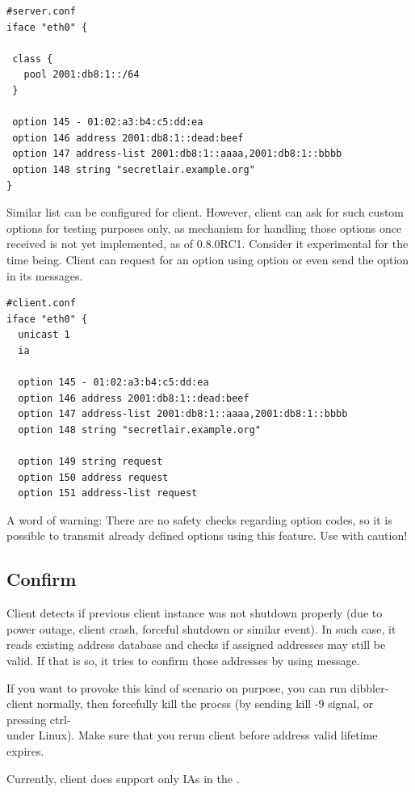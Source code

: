 \begin{lstlisting}
#server.conf
iface "eth0" {

 class {
   pool 2001:db8:1::/64
 }

 option 145 - 01:02:a3:b4:c5:dd:ea
 option 146 address 2001:db8:1::dead:beef
 option 147 address-list 2001:db8:1::aaaa,2001:db8:1::bbbb
 option 148 string "secretlair.example.org"
}
\end{lstlisting}

Similar list can be configured for client. However, client can ask
for such custom options for testing purposes only, as mechanism for
handling those options once received is not yet implemented, as of
0.8.0RC1. Consider it experimental for the time being. Client can 
request for an option using  option or even send the option
in its messages.

\begin{lstlisting}
#client.conf
iface "eth0" {
  unicast 1
  ia

  option 145 - 01:02:a3:b4:c5:dd:ea
  option 146 address 2001:db8:1::dead:beef
  option 147 address-list 2001:db8:1::aaaa,2001:db8:1::bbbb
  option 148 string "secretlair.example.org"

  option 149 string request
  option 150 address request
  option 151 address-list request
\end{lstlisting}

A word of warning: There are no safety checks regarding option codes,
so it is possible to transmit already defined options using this
feature. Use with caution!

\subsection{Confirm}
\label{features-confirm}
Client detects if previous client instance was not shutdown properly
(due to power outage, client crash, forceful shutdown or similar
event). In such case, it reads existing address database and checks if 
assigned addresses may still be valid. If that is so, it tries to 
confirm those addresses by using  message.

If you want to provoke this kind of scenario on purpose, you can run
dibbler-client normally, then forcefully kill the procss (by sending
kill -9 signal, or pressing ctrl-\\ under Linux). Make sure that you
rerun client before address valid lifetime expires.

Currently, client does support only IAs in the .

